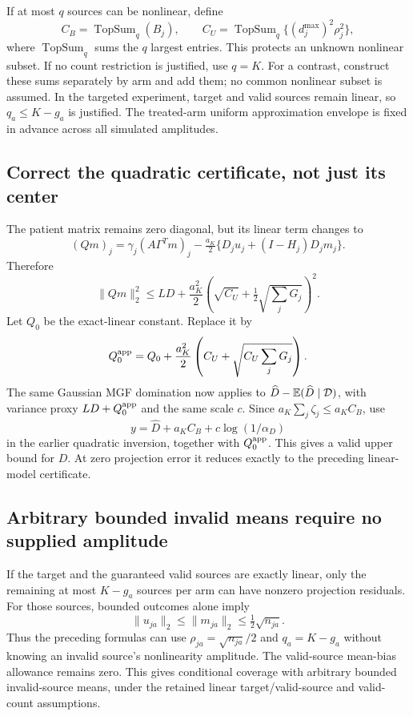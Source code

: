 If at most $q$ sources can be nonlinear, define
\[
 C_B=\operatorname{TopSum}_q(B_j),\qquad
 C_U=\operatorname{TopSum}_q\{(d_j^{\max})^2\rho_j^2\},
\]
where $\operatorname{TopSum}_q$ sums the $q$ largest entries. This protects an
unknown nonlinear subset. If no count restriction is justified, use $q=K$.
For a contrast, construct these sums separately by arm and add them; no common
nonlinear subset is assumed. In the targeted experiment, target and valid
sources remain linear, so $q_a\le K-g_a$ is justified. The treated-arm uniform
approximation envelope is fixed in advance across all simulated amplitudes.

\subsection{Correct the quadratic certificate, not just its center}

The patient matrix remains zero diagonal, but its linear term changes to
\[
 (Qm)_j=\gamma_j(A\Gamma^Tm)_j-\tfrac{a_K}{2}
        \{D_ju_j+(I-H_j)D_jm_j\}.
\]
Therefore
\[
 \|Qm\|_2^2\le LD+
  \frac{a_K^2}{2}\left(\sqrt{C_U}+\tfrac12\sqrt{\sum_jG_j}\right)^2.
\]
Let $Q_0$ be the exact-linear constant. Replace it by
\[
 Q_0^{\rm app}=Q_0+\frac{a_K^2}{2}
          \left(C_U+\sqrt{C_U\sum_jG_j}\right).
\]
The same Gaussian MGF domination now applies to
$\widehat D-\mathbb E(\widehat D\mid\mathcal D)$, with variance proxy
$LD+Q_0^{\rm app}$ and the same scale $c$. Since
$a_K\sum_j\zeta_j\le a_K C_B$, use
\[
 y=\widehat D+a_K C_B+c\log(1/\alpha_D)
\]
in the earlier quadratic inversion, together with $Q_0^{\rm app}$.
This gives a valid upper bound for $D$. At zero projection error it reduces
exactly to the preceding linear-model certificate.

\subsection{Arbitrary bounded invalid means require no supplied amplitude}

If the target and the guaranteed valid sources are exactly linear, only the
remaining at most $K-g_a$ sources per arm can have nonzero projection residuals.
For those sources, bounded outcomes alone imply
\[
 \|u_{ja}\|_2\le\|m_{ja}\|_2\le\tfrac12\sqrt{n_{ja}}.
\]
Thus the preceding formulas can use $\rho_{ja}=\sqrt{n_{ja}}/2$ and
$q_a=K-g_a$ without knowing an invalid source's nonlinearity amplitude.
The valid-source mean-bias allowance remains zero. This gives conditional
coverage with arbitrary bounded invalid-source means, under the retained
linear target/valid-source and valid-count assumptions.

